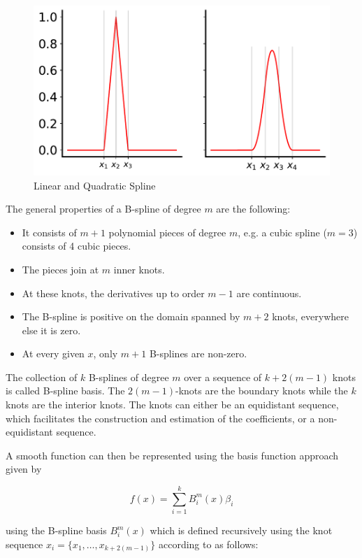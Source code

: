 \documentclass[10pt,a4paper]{article}
\begin{document}
\begin{figure}[H]
	\centering
	\includegraphics[width=\columnwidth]{../thesisplots/linear_and_quadratic_spline.pdf}
	\caption{Linear and Quadratic Spline}
	\label{fig:lin_and_quad_spline}
\end{figure}


The general properties of a B-spline of degree $m$ are the following:

\begin{itemize}
	\item It consists of $m+1$ polynomial pieces of degree $m$, e.g. a cubic spline ($m=3$) consists of 4 cubic pieces.
	\item The pieces join at $m$ inner knots.
	\item At these knots, the derivatives up to order $m-1$ are continuous.
	\item The B-spline is positive on the domain spanned by $m+2$ knots, everywhere else it is zero.
	\item At every given $x$, only $m+1$ B-splines are non-zero.
\end{itemize}

The collection of $k$ B-splines of degree $m$ over a sequence of $k+2(m-1)$ knots is called B-spline basis. The $2(m-1)$-knots are the boundary knots while the $k$ knots are the interior knots. The knots can either be an equidistant sequence, which facilitates the construction and estimation of the coefficients, or a non-equidistant sequence.

A smooth function can then be represented using the basis function approach given by

$$f(x) = \sum_{i=1}^k B_i^m(x) \beta_i $$

using the B-spline basis $B_i^m(x)$ which is defined recursively using the knot sequence $x_i = \{x_1, \dots, x_{k+2(m-1)}\}$ according to \cite{deBoor1978practicalGuideToSplines} as follows:
\end{document}

